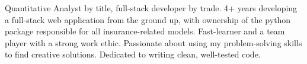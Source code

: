 \documentclass[9pt]{developercv} %
\begin{document}


\begin{minipage}[t]{0.46\textwidth} %
	\vspace{-\baselineskip} %
	\vspace{0pt} 
	Quantitative Analyst by title, full-stack developer by trade.
	4+ years developing a full-stack web application from the ground up, with ownership of the python package responsible for all insurance-related models.
	Fast-learner and a team player with a strong work ethic.
	Passionate about using my problem-solving skills to find creative solutions.
	Dedicated to writing clean, well-tested code.
\end{minipage}
\hspace{0.5cm} %
\end{document}
